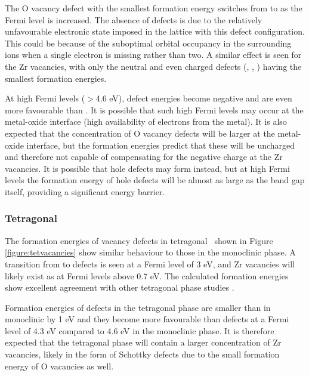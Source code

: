 The O vacancy defect with the smallest formation energy switches from  to  as the Fermi level is increased. The absence of  defects is due to the relatively unfavourable electronic state imposed in the lattice with this defect configuration. This could be because of the suboptimal orbital occupancy in the surrounding ions when a single electron is missing rather than two. A similar effect is seen for the Zr vacancies, with only the neutral and even charged defects (, , ) having the smallest formation energies.

At high Fermi levels ($>$4.6 eV),  defect energies become negative and are even more favourable than . It is possible that such high Fermi levels may occur at the metal-oxide interface (high availability of electrons from the metal). It is also expected that the concentration of O vacancy defects will be larger at the metal-oxide interface, but the formation energies predict that these will be uncharged and therefore not capable of compensating for the negative charge at the Zr vacancies. It is possible that hole defects may form instead, but at high Fermi levels the formation energy of hole defects will be almost as large as the band gap itself, providing a significant energy barrier.

\subsubsection{Tetragonal}

The formation energies of vacancy defects in tetragonal \zirconia\ shown in Figure \ref{figure:tetvacancies} show similar behaviour to those in the monoclinic phase. A transition from  to  defects is seen at a Fermi level of 3 eV, and Zr vacancies will likely exist as  at Fermi levels above 0.7 eV. The calculated formation energies show excellent agreement with other tetragonal phase studies \cite{youssef2012intrinsic}.

Formation energies of  defects in the tetragonal phase are smaller than in monoclinic by 1 eV and they become more favourable than  defects at a Fermi level of 4.3 eV compared to 4.6 eV in the monoclinic phase. It is therefore expected that the tetragonal phase will contain a larger concentration of Zr vacancies, likely in the form of Schottky defects due to the small formation energy of O vacancies as well. 

